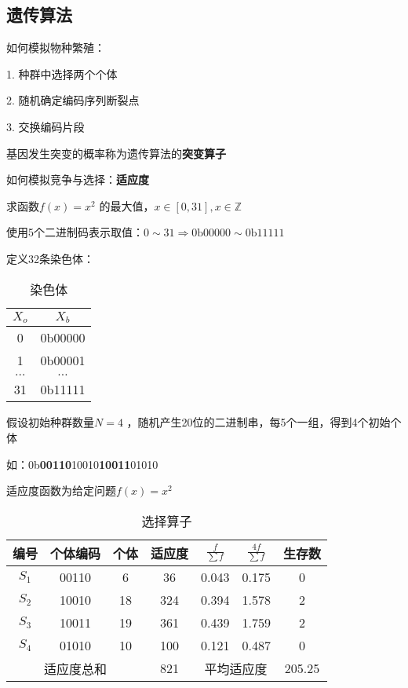 \subsection{遗传算法}%
\label{sub:遗传算法}
\begin{notation}
    如何模拟物种繁殖：

    1. 种群中选择两个个体

    2. 随机确定编码序列断裂点

    3. 交换编码片段

    基因发生突变的概率称为遗传算法的\textbf{突变算子}
\end{notation}
\begin{notation}
    如何模拟竞争与选择：\textbf{适应度}
\end{notation}
\begin{eg}
    求函数$f\left( x \right) =x^2$ 的最大值，$x\in [0,31],x\in \mathbb{Z}$

    使用5个二进制码表示取值：$0\sim 31\Rightarrow \text{0b00000} \sim \text{0b11111}$ 

    定义32条染色体：
     \begin{table}[htpb]
        \centering
        \caption{染色体}
        \label{tab:染色体}
        \begin{tabular}{|c|c|}
        \hline
        $X_o$ & $X_b$ \\
        \hline
        0 & 0b00000\\
        1 & 0b00001\\
        $\ldots $ & $\ldots $ \\
        31 & 0b11111\\
        \hline
        \end{tabular}
    \end{table}
    
    假设初始种群数量$N=4$ ，随机产生20位的二进制串，每5个一组，得到4个初始个体

    如：0b\textbf{00110}10010\textbf{10011}01010

    适应度函数为给定问题$f\left( x \right) =x^2$
    \begin{table}[htpb]
        \centering
        \caption{选择算子}
        \label{tab:选择算子}
        \begin{tabular}{|c|c|c|c|c|c|c|}
        \hline
        编号 & 个体编码 & 个体 & 适应度 & $\displaystyle{\frac{f}{\sum f}} $ & $\displaystyle{\frac{4f}{\sum f}} $ & 生存数 \\
        \hline
        $S_1$ & 00110 & 6 & 36 & 0.043 & 0.175 & 0\\
        $S_2$ & 10010 & 18 & 324 & 0.394 & 1.578 & 2\\
        $S_3$ & 10011 & 19 & 361 & 0.439 & 1.759 & 2\\
        $S_4$ & 01010 & 10 & 100 & 0.121 & 0.487 & 0\\
        \hline
        \multicolumn{3}{|c|}{适应度总和} & 821 & \multicolumn{2}{|c|}{平均适应度} & 205.25\\
        \hline
        \end{tabular}
    \end{table}


\end{eg}
